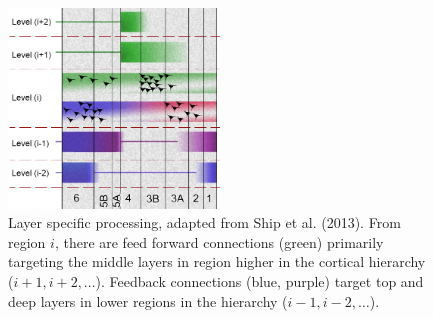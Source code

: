 \begin{figure}[!ht]
	\centering
	\includegraphics[width=0.5\textwidth, clip=true]{./Chapters/01_Introduction/Images/LaminarProcessing}
	\caption{Layer specific processing, adapted from Ship et al. (2013)\cite{Shipp2013}. From region $i$, there are feed forward connections (green) primarily targeting the middle layers in region higher in the cortical hierarchy ($i+1, i+2, \ldots$). Feedback connections (blue, purple) target top and deep layers in lower regions in the hierarchy ($i-1, i-2, \ldots$).}
	\label{fig:layerprocessing}
\end{figure}